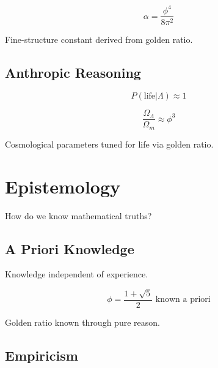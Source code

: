 \begin{theorem}
\label{fa_31:thm:golden-constants}
\begin{equation}
\alpha = \frac{\phi^4}{8\pi^2}
\end{equation}

Fine-structure constant derived from golden ratio.
\end{theorem}

\subsection{Anthropic Reasoning}

\begin{equation}
P(\text{life}|\Lambda) \approx 1
\end{equation}

\begin{proposition}
\label{fa_31:prop:golden-anthropic}
\begin{equation}
\frac{\Omega_\Lambda}{\Omega_m} \approx \phi^3
\end{equation}

Cosmological parameters tuned for life via golden ratio.
\end{proposition}

\section{Epistemology}

How do we know mathematical truths?

\subsection{A Priori Knowledge}

\begin{definition}[A Priori]
\label{fa_31:def:apriori}
Knowledge independent of experience.
\end{definition}

\begin{theorem}
\label{fa_31:thm:apriori-golden}
\begin{equation}
\phi = \frac{1+\sqrt{5}}{2} \text{ known a priori}
\end{equation}

Golden ratio known through pure reason.
\end{theorem}

\subsection{Empiricism}

